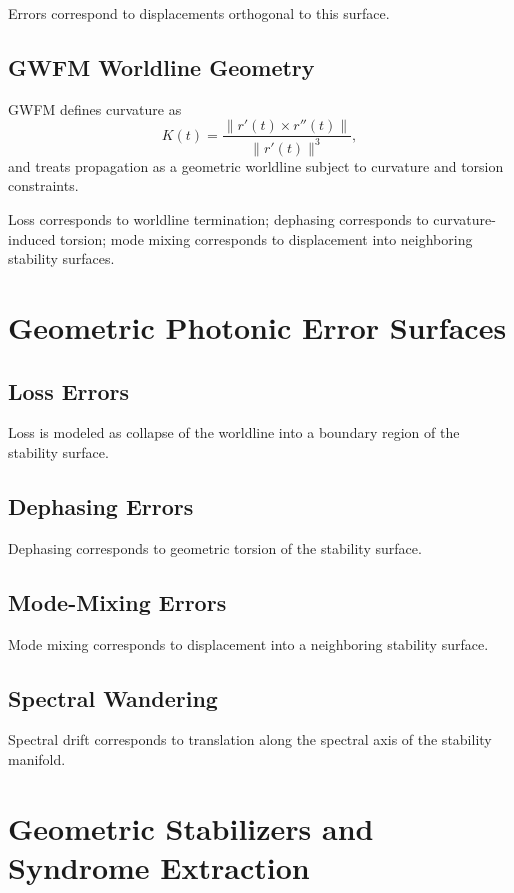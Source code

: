 \documentclass[aip, adv, reprint, superscriptaddress]{revtex4-2}
\begin{document}
Errors correspond to displacements orthogonal to this surface.

\subsection{GWFM Worldline Geometry}

GWFM defines curvature as
\begin{equation}
K(t) = \frac{\| r'(t) \times r''(t) \|}{\| r'(t) \|^3},
\end{equation}
and treats propagation as a geometric worldline subject to curvature and torsion 
constraints.

Loss corresponds to worldline termination; dephasing corresponds to curvature-induced 
torsion; mode mixing corresponds to displacement into neighboring stability surfaces.

\section{Geometric Photonic Error Surfaces}

\subsection{Loss Errors}

Loss is modeled as collapse of the worldline into a boundary region of the stability 
surface.

\subsection{Dephasing Errors}

Dephasing corresponds to geometric torsion of the stability surface.

\subsection{Mode-Mixing Errors}

Mode mixing corresponds to displacement into a neighboring stability surface.

\subsection{Spectral Wandering}

Spectral drift corresponds to translation along the spectral axis of the stability manifold.

\section{Geometric Stabilizers and Syndrome Extraction}
\end{document}
